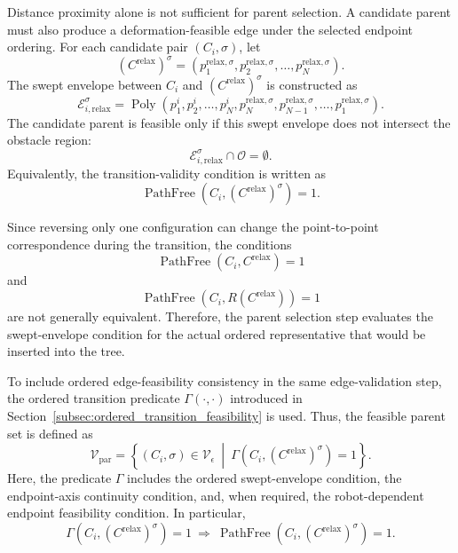 \documentclass{pas}
\begin{document}
Distance proximity alone is not sufficient for parent selection. A candidate
parent must also produce a deformation-feasible edge under the selected endpoint
ordering. For each candidate pair \(\left(C_i,\sigma\right)\), let
\[
\left(C^{\mathrm{relax}}\right)^{\sigma}
=
\left(
p_1^{\mathrm{relax},\sigma},
p_2^{\mathrm{relax},\sigma},
\ldots,
p_N^{\mathrm{relax},\sigma}
\right).
\]
The swept envelope between \(C_i\) and
\(\left(C^{\mathrm{relax}}\right)^{\sigma}\) is constructed as
\begin{equation}
\mathcal{E}_{i,\mathrm{relax}}^{\sigma}
=
\operatorname{Poly}
\left(
p_1^{i},p_2^{i},\ldots,p_N^{i},
p_N^{\mathrm{relax},\sigma},
p_{N-1}^{\mathrm{relax},\sigma},
\ldots,
p_1^{\mathrm{relax},\sigma}
\right).
\label{eq:parent_swept_envelope}
\end{equation}
The candidate parent is feasible only if this swept envelope does not intersect
the obstacle region:
\begin{equation}
\mathcal{E}_{i,\mathrm{relax}}^{\sigma}
\cap
\mathcal{O}
=
\emptyset .
\label{eq:parent_swept_envelope_free}
\end{equation}
Equivalently, the transition-validity condition is written as
\begin{equation}
\operatorname{PathFree}
\left(
C_i,
\left(C^{\mathrm{relax}}\right)^{\sigma}
\right)
=
1 .
\label{eq:parent_path_free_check}
\end{equation}

Since reversing only one configuration can change the point-to-point
correspondence during the transition, the conditions
\[
\operatorname{PathFree}
\left(
C_i,
C^{\mathrm{relax}}
\right)
=
1
\]
and
\[
\operatorname{PathFree}
\left(
C_i,
R\left(C^{\mathrm{relax}}\right)
\right)
=
1
\]
are not generally equivalent. Therefore, the parent selection step evaluates the
swept-envelope condition for the actual ordered representative that would be
inserted into the tree.

To include ordered edge-feasibility consistency in the same edge-validation step, the
ordered transition predicate \(\Gamma(\cdot,\cdot)\) introduced in
Section~\ref{subsec:ordered_transition_feasibility} is used. Thus, the feasible
parent set is defined as
\begin{equation}
\mathcal{V}_{\mathrm{par}}
=
\left\{
\left(C_i,\sigma\right)\in \mathcal{V}_{\epsilon}
\ \middle|\
\Gamma
\left(
C_i,
\left(C^{\mathrm{relax}}\right)^{\sigma}
\right)
=
1
\right\}.
\label{eq:feasible_parent_set}
\end{equation}
Here, the predicate \(\Gamma\) includes the ordered swept-envelope condition,
the endpoint-axis continuity condition, and, when required, the robot-dependent
endpoint feasibility condition. In particular,
\begin{equation}
\Gamma
\left(
C_i,
\left(C^{\mathrm{relax}}\right)^{\sigma}
\right)
=
1
\
\Longrightarrow
\
\operatorname{PathFree}
\left(
C_i,
\left(C^{\mathrm{relax}}\right)^{\sigma}
\right)
=
1 .
\label{eq:gamma_implies_pathfree_parent}
\end{equation}
\end{document}
